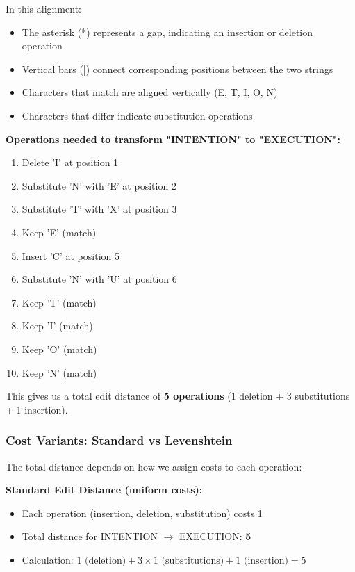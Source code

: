 \documentclass[11pt,a4paper]{article}
\theoremstyle{definition}
\theoremstyle{plain}
\theoremstyle{remark}
\begin{document}
In this alignment:
\begin{itemize}
    \item The asterisk (*) represents a gap, indicating an insertion or deletion operation
    \item Vertical bars (|) connect corresponding positions between the two strings
    \item Characters that match are aligned vertically (E, T, I, O, N)
    \item Characters that differ indicate substitution operations
\end{itemize}

\textbf{Operations needed to transform "INTENTION" to "EXECUTION":}
\begin{enumerate}
    \item Delete 'I' at position 1
    \item Substitute 'N' with 'E' at position 2
    \item Substitute 'T' with 'X' at position 3
    \item Keep 'E' (match)
    \item Insert 'C' at position 5
    \item Substitute 'N' with 'U' at position 6
    \item Keep 'T' (match)
    \item Keep 'I' (match)
    \item Keep 'O' (match)
    \item Keep 'N' (match)
\end{enumerate}

This gives us a total edit distance of \textbf{5 operations} (1 deletion + 3 substitutions + 1 insertion).

\subsubsection{Cost Variants: Standard vs Levenshtein}

The total distance depends on how we assign costs to each operation:

\textbf{Standard Edit Distance (uniform costs):}
\begin{itemize}
    \item Each operation (insertion, deletion, substitution) costs 1
    \item Total distance for INTENTION $\rightarrow$ EXECUTION: \textbf{5}
    \item Calculation: $1 \text{ (deletion)} + 3 \times 1 \text{ (substitutions)} + 1 \text{ (insertion)} = 5$
\end{itemize}
\end{document}
